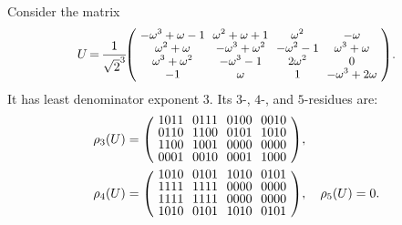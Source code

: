 \begin{example}\label{exa-k-residue}
  Consider the matrix
  \[ \small U \,{=}\, \frac{\small 1}{\small \sqrt{2}^3}\!\footnotesize\zmatrix{cccc}{
    -\omega^3+\omega -1          
			& \omega^2+\omega+1 
				& \omega^2 
					& -\omega\\
    \omega^2+\omega 
			& -\omega^3+\omega^2 
				& -\omega^2-1
					& \omega^3+\omega \\
    \omega^3+\omega^2
			& -\omega^3-1
				& 2\omega^2 
					&0 \\
    -1
			& \omega
				& 1 
					& -\omega^3+2\omega
    }.
  \]
  It has least denominator exponent $3$. Its $3$-, $4$-, and $5$-residues are:
  \[ 
    \begin{split}
    &
    \rho_3(U) = \zmatrix{cccc}{
      1011 & 0111 & 0100 & 0010\\
      0110 & 1100 & 0101 & 1010\\
      1100 & 1001 & 0000 & 0000\\
      0001 & 0010 & 0001 & 1000
    },
    \\&
    \rho_4(U) = \zmatrix{cccc}{
      1010 & 0101 & 1010 & 0101\\
      1111 & 1111 & 0000 & 0000\\
      1111 & 1111 & 0000 & 0000\\
      1010 & 0101 & 1010 & 0101
    },\quad
    \rho_5(U) = 0.\end{split}
  \]
\end{example}




